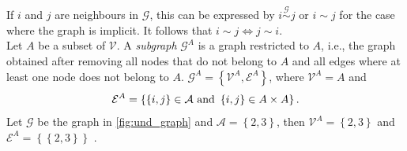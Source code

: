 If $i$ and $j$ are neighbours in $\mathcal{G}$, this can be expressed by $i\overset{\mathcal{G}}{\sim}j$ or $i\sim j$ for the case where the graph is implicit. It follows that $i\sim j\Longleftrightarrow j\sim i$. \\
Let $A$ be a subset of $\mathcal{V}$. A \textit{subgraph} $\mathcal{G}^A$ is a graph restricted to $A$, i.e., the graph obtained after removing all nodes that do not belong to $A$ and all edges where at least one node does not belong to $A$. $\mathcal{G}^A=\left\lbrace\mathcal{V}^A,\mathcal{E}^A\right\rbrace$, where $\mathcal{V}^A=A$ and 
\begin{equation*}
    \mathcal{E}^A = \left\lbrace\left\lbrace i,j\right\rbrace\in\mathcal{A} \hbox{ and } \left\lbrace i,j\right\rbrace\in A\times A\right\rbrace.
\end{equation*}
Let $\mathcal{G}$ be the graph in \autoref{fig:und_graph} and $\mathcal{A}=\left\lbrace2,3\right\rbrace$, then $\mathcal{V}^A=\left\lbrace2,3\right\rbrace$ and $\mathcal{E}^A=\left\lbrace\left\lbrace 2,3\right\rbrace\right\rbrace$ \autocite[][17--18]{rue2005gaussian}.
